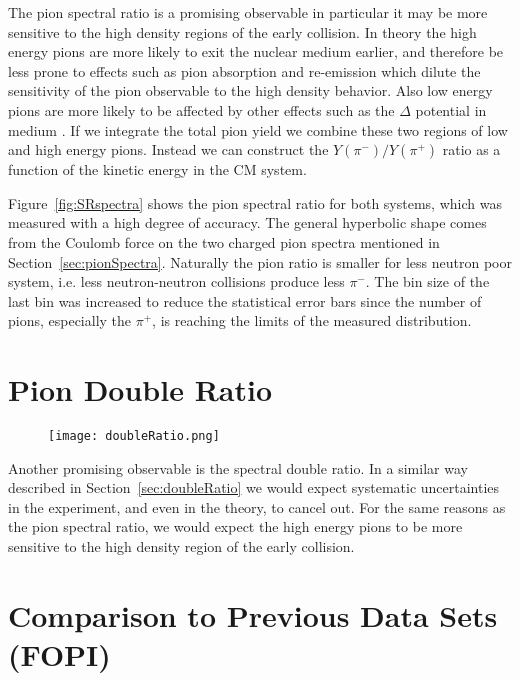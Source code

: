 The pion spectral ratio is a promising observable in particular it may be more sensitive to the high density regions of the early collision. In theory the high energy pions are more likely to exit the nuclear medium earlier, and therefore be less prone to effects such as pion absorption and re-emission which dilute the sensitivity of the pion observable to the high density behavior. Also low energy pions are more likely to be affected by other effects such as the $\Delta$ potential in medium \cite{baoan_deltapotential}. If we integrate the total pion yield we combine these two regions of low and high energy pions. Instead we can construct the $Y(\pi^-)/Y(\pi^+)$ ratio as a function of the kinetic energy in the CM system. 


Figure~\ref{fig:SRspectra} shows the pion spectral ratio for both systems, which was measured with a high degree of accuracy. The general hyperbolic shape comes from the Coulomb force on the two charged pion spectra mentioned in Section~\ref{sec:pionSpectra}. Naturally the pion ratio is smaller for less neutron poor system, i.e. less neutron-neutron collisions produce less $\pi^-$. The bin size of the last bin was increased to reduce the statistical error bars since the number of pions, especially the $\pi^+$, is reaching the limits of the measured distribution. 




\section{Pion Double Ratio}

\begin{figure}[!htb]
\centering
\texttt{[image: doubleRatio.png]}
\caption{}
\label{fig:spectraDR}
\end{figure}

Another promising observable is the spectral double ratio. In a similar way described in Section~\ref{sec:doubleRatio} we would expect systematic uncertainties in the experiment, and even in the theory, to cancel out. For the same reasons as the pion spectral ratio, we would expect the high energy pions to be more sensitive to the high density region of the early collision. 



\section{Comparison to Previous Data Sets (FOPI)}


